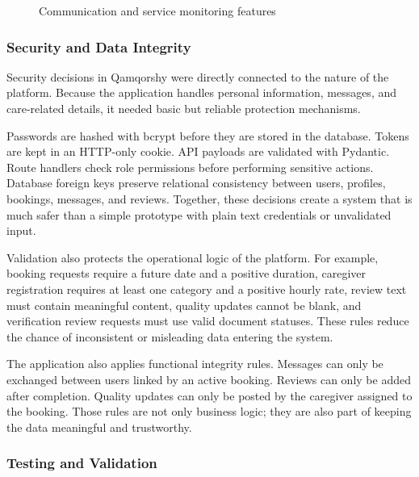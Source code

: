 \documentclass[12pt,a4paper]{article}
\begin{document}
\begin{figure}[H]
\centering
{}
\caption{Communication and service monitoring features}
\label{fig:communication-placeholder}
\end{figure}

\subsubsection{Security and Data Integrity}

Security decisions in Qamqorshy were directly connected to the nature of the platform. Because the application handles personal information, messages, and care-related details, it needed basic but reliable protection mechanisms.

Passwords are hashed with bcrypt before they are stored in the database. Tokens are kept in an HTTP-only cookie. API payloads are validated with Pydantic. Route handlers check role permissions before performing sensitive actions. Database foreign keys preserve relational consistency between users, profiles, bookings, messages, and reviews. Together, these decisions create a system that is much safer than a simple prototype with plain text credentials or unvalidated input.

Validation also protects the operational logic of the platform. For example, booking requests require a future date and a positive duration, caregiver registration requires at least one category and a positive hourly rate, review text must contain meaningful content, quality updates cannot be blank, and verification review requests must use valid document statuses. These rules reduce the chance of inconsistent or misleading data entering the system.

The application also applies functional integrity rules. Messages can only be exchanged between users linked by an active booking. Reviews can only be added after completion. Quality updates can only be posted by the caregiver assigned to the booking. Those rules are not only business logic; they are also part of keeping the data meaningful and trustworthy.

\subsubsection{Testing and Validation}
\end{document}
